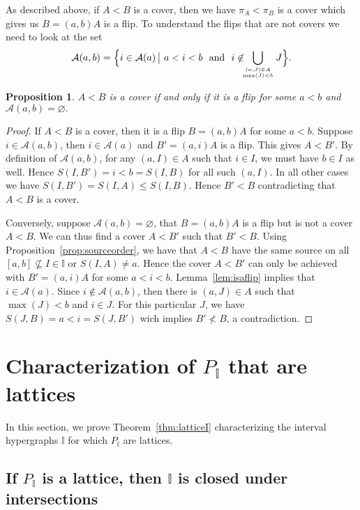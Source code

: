 \documentclass[reqno]{amsart}
\newtheorem{proposition}[theorem]{Proposition}
\theoremstyle{definition}
\newcommand{\II}{\mathbb I} %
\newcommand{\cA}{\mathcal A} %
\begin{document}
As described above, if $A<B$ is a cover, then we have $\pi_A<\pi_B$ is a cover which gives us $B=(a,b)A$ is a  flip.
To understand the flips that are not covers we need to look at the set
 $$\cA(a,b)= \Big\{ i\in \cA (a) \,\big|\  a<i<b\  \text { and }\  i\not\in \!\!\!\bigcup_{(a,J)\in A \atop \max(J)<b} J \Big\}.$$
 
\begin{proposition} \label{prop:segcover}
$A<B$  is a cover if and only if it is a flip for some $a<b$ and $ \cA(a,b)=\varnothing .$
\end{proposition}

\begin{proof}
If $A<B$  is a cover, then it is a flip $B=(a,b)A$ for some $a<b$.
Suppose $i\in  \cA(a,b)$, then $i\in \cA(a)$ and $B'=(a,i)A$ is a flip. This gives $A<B'$. By definition of $\cA(a,b)$, for any $(a,I)\in A$ such that $i\in I$, we must have $b\in I$ as well.
Hence $S(I,B')=i<b=S(I,B)$ for all such $(a,I)$. In all other cases we have $S(I,B')=S(I,A)\le S(I,B)$. Hence $B'<B$ contradicting that $A<B$ is a cover.

Conversely, suppose $ \cA(a,b)=\varnothing $, that $B=(a,b)A$ is a flip but  is not a cover $A<B$.
We can thus find a cover $A<B'$ such that $B'<B$.
Using Proposition~\ref{prop:sourceorder}, we have that $A<B$ have the same source on all $[a,b]\not\subseteq I\in \II$ or $S(I,A)\ne a$. 
Hence the cover $A<B'$ can only be achieved with $B'=(a,i)A$ for some $a<i<b$. Lemma~\ref{lem:isaflip} implies that $i\in \cA(a)$.
Since $i\not\in \cA(a,b)$, then there is $(a,J)\in A$ such that $\max(J)<b$ and $i\in J$. For this particular $J$, we have $S(J,B) = a < i = S(J,B')$
wich implies $B'\not < B$, a contradiction.
\end{proof}


\section{Characterization of  $P_\II$ that are lattices}
\label{sec:LatticePI}

In this section, we  prove  Theorem~\ref{thm:latticeI} characterizing the interval hypergraphs $\II$ for which $P_\II$ are lattices.


\subsection{If $P_\II$ is a lattice, then $\II$ is closed under intersections}  
\label{subsec:latticeI}
\end{document}
